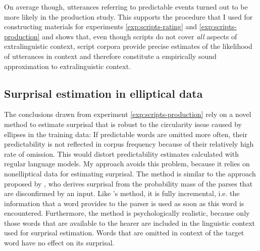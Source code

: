 On average though, utterances referring to predictable events turned out to be more likely in the production study. This supports the procedure that I used for constructing materials for experiments \ref{exp:scripts-rating} and \ref{exp:scripts-production} and shows that, even though scripts do not cover \textit{all} aspects of extralinguistic context, script corpora provide precise estimates of the likelihood of utterances in context and therefore constitute a empirically sound approximation to extralinguistic context.

\subsection{Surprisal estimation in elliptical data}

The conclusions drawn from experiment \ref{exp:scripts-production} rely on a novel method to estimate surprisal that is robust to the circularity issue caused by ellipses in the training data: If predictable words are omitted more often, their predictability is not reflected in corpus frequency because of their relatively high rate of omission. This would distort predictability estimates calculated with regular language models. My approach avoids this problem, because it relies on nonelliptical data for estimating surprisal. The method is similar to the approach proposed by \citet{hale2001}, who derives surprisal from the probability mass of the parses that are disconfirmed by an input. Like \citeauthor{hale2001}'s method, it is fully incremental, i.e. the information that a word provides to the parser is used as soon as this word is encountered. Furthermore, the method is psychologically realistic, because only those words that are available to the hearer are included in the linguistic context used for surprisal estimation. Words that are omitted in context of the target word have no effect on its surprisal.

